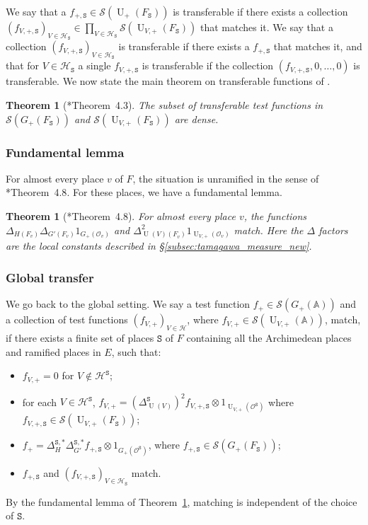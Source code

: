 \documentclass[letterpaper,11pt]{amsart}
\newcommand{\bA}{\mathbb{A}}
\newcommand{\cH}{\mathcal{H}}
\newcommand{\cO}{\mathcal{O}}
\newcommand{\cS}{\mathcal{S}}
\newcommand{\tS}{\mathtt{S}}
\newcommand{\<}{\negthickspace}
\DeclareMathOperator{\U}{U}
\theoremstyle{definition}
\theoremstyle{plain}
\newtheorem{theorem}[definition]{Theorem}
\theoremstyle{remark}
\numberwithin{equation}{section}
\begin{document}
We say that a $f_{+,\tS} \in \cS(\U_+(F_\tS))$ is transferable if there exists a collection $(f_{V,+,\tS})_{V \in \cH_\tS} \in \prod_{V \in \cH_\tS} \cS(\U_{V,+}(F_\tS))$ that matches it. We say that a collection $(f_{V,+,\tS})_{V \in \cH_\tS}$ is transferable if there exists a $f_{+,\tS}$ that matches it, and that for $V \in \cH_\tS$ a single $f_{V,+,\tS}$ is transferable if the collection $(f_{V,+,\tS},0,\hdots,0)$ is transferable. We now state the main theorem on transferable functions of \cite{BLX2}. 

\begin{theorem}[\cite{BLX2}*{Theorem~4.3}]
    \label{thm:matching}
    The subset of transferable test functions in $\cS(G_+(F_\tS))$ and $\cS(\U_{V,+}(F_\tS))$ are dense. 
\end{theorem}

\subsubsection{Fundamental lemma}
\label{subsubsec:FL}
For almost every place $v$ of $F$, the situation is unramified in the sense of \cite{BLX2}*{Theorem~4.8}. For these places, we have a fundamental lemma. 

\begin{theorem}[\cite{BLX2}*{Theorem~4.8}]
    \label{thm:FL_FJ}
    For almost every place $v$, the functions $\Delta_{H(F_v)} \Delta_{G'(F_v)} 1_{G_+(\cO_v)}$ and $\Delta_{\U(V)(F_v)}^2 1_{\U_{V,+}(\cO_v)}$ match. Here the $\Delta$ factors are the local constants described in \S\ref{subsec:tamagawa_measure_new}.
\end{theorem}


\subsubsection{Global transfer}

We go back to the global setting. We say a test function $f_+ \in \cS(G_+(\bA))$ and a collection of test functions $(f_{V,+})_{V \in \cH}$, where $f_{V,+} \in \cS(\U_{V,+}(\bA))$, match, if there exists a finite set of places $\tS$ of $F$ containing all the Archimedean places and ramified places in $E$, such that:
\begin{itemize}
    \item $f_{V,+} = 0$ for $V \not \in \cH^{\tS}$;
    \item for each $V \in \cH^{\tS}$, $f_{V,+} = (\Delta_{\U(V)}^{\tS})^2 f_{V,+,\tS} \otimes 1_{\U_{V,+}(\cO^\tS)}$ where $ f_{V,+,\tS}
        \in \cS(\U_{V,+}(F_\tS))$;
    \item $f_+ = \Delta_H^{\tS,*} \Delta_{G'}^{\tS,*} f_{+,\tS} \otimes
        1_{G_+(\cO^\tS)}$, where $f_{+,\tS} \in \cS(G_+(F_\tS))$;
    \item $f_{+,\tS}$ and $(f_{V,+,\tS})_{V \in \cH_{\tS}}$ match.
\end{itemize}
By the fundamental lemma of Theorem~\ref{thm:FL_FJ}, matching is independent of the choice of $\tS$. 
\end{document}
